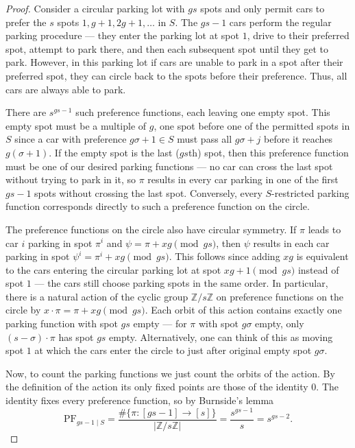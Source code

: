 \documentclass[12 pt]{amsart}
\theoremstyle{definition} %
\theoremstyle{remark} %
\begin{document}
\begin{proof}
	Consider a circular parking lot with $gs$ spots and only permit cars to prefer the $s$ spots $1, g + 1, 2g + 1, \dots$ in $S$. The $gs - 1$ cars perform the regular parking procedure --- they enter the parking lot at spot $1$, drive to their preferred spot, attempt to park there, and then each subsequent spot until they get to park. However, in this parking lot if cars are unable to park in a spot after their preferred spot, they can circle back to the spots before their preference. Thus, all cars are always able to park.

	There are $s^{gs - 1}$ such preference functions, each leaving one empty spot. This empty spot must be a multiple of $g$, one spot before one of the permitted spots in $S$ since a car with preference $g \sigma + 1 \in S$ must pass all $g \sigma + j$ before it reaches $g (\sigma + 1)$. If the empty spot is the last ($gs$th) spot, then this preference function must be one of our desired parking functions --- no car can cross the last spot without trying to park in it, so $\pi$ results in every car parking in one of the first $gs - 1$ spots without crossing the last spot. Conversely, every $S$-restricted parking function corresponds directly to such a preference function on the circle.

	The preference functions on the circle also have circular symmetry. If $\pi$ leads to car $i$ parking in spot $\pi^{i}$ and $\psi = \pi + xg \pmod{gs}$, then $\psi$ results in each car parking in spot $\psi^{i} = \pi^{i} + xg \pmod{gs}$. This follows since adding $xg$ is equivalent to the cars entering the circular parking lot at spot $xg + 1 \pmod {gs}$ instead of spot $1$ --- the cars still choose parking spots in the same order. In particular, there is a natural action of the cyclic group $\mathbb{Z} / s \mathbb{Z}$ on preference functions on the circle by $x \cdot \pi = \pi + xg \pmod{gs}$. Each orbit of this action contains exactly one parking function with spot $gs$ empty --- for $\pi$ with spot $g \sigma$ empty, only $(s - \sigma) \cdot \pi$ has spot $gs$ empty. Alternatively, one can think of this as moving spot $1$ at which the cars enter the circle to just after original empty spot $g \sigma$.

	Now, to count the parking functions we just count the orbits of the action. By the definition of the action its only fixed points are those of the identity $0$. The identity fixes every preference function, so by Burnside's lemma
	\[
		\mathrm{PF}_{gs - 1 \mid S} = \frac{\# \{ \pi : [gs - 1] \to [s] \}}{\lvert \mathbb{Z} / s \mathbb{Z} \rvert} = \frac{s^{gs - 1}}{s} = s^{gs - 2}.
	\]
\end{proof}
\end{document}
